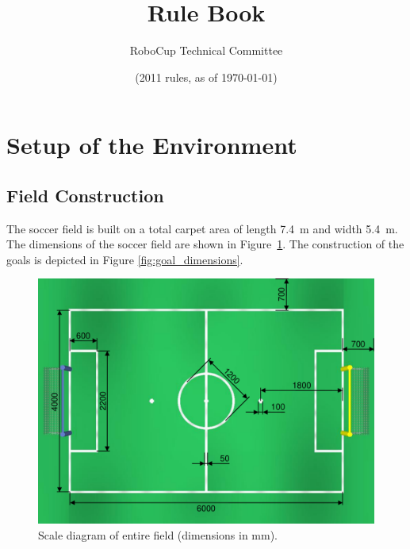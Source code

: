 \documentclass[12pt]{article}
\title{\leaguename Rule Book}
\author{RoboCup Technical Committee}
\date{(2011 rules, as of \today)}
\newcommand{\TotalWidth}{5.4~m\xspace}
\newcommand{\TotalLength}{7.4~m\xspace }
\begin{document}
\maketitle

\vfill

\tableofcontents
\setcounter{tocdepth}{3}

\thispagestyle{fancy}

\clearpage

\cfoot{\thepage}
\setcounter{page}{1}

\section{Setup of the Environment}

\subsection{Field Construction}
\label{sec:field_dim}

The soccer field is built on a total carpet area of length \TotalLength and width \TotalWidth. The dimensions of the soccer field are shown in Figure~\ref{fig:field_dim}. The construction of the goals is depicted in Figure \ref{fig:goal_dimensions}.

\begin{figure}[b!]
\centerline{\includegraphics[width=\columnwidth]{figs/fieldDimensions2010.pdf}}
\caption{Scale diagram of entire field (dimensions in mm).} \label{fig:field_dim}
\end{figure}
\end{document}
